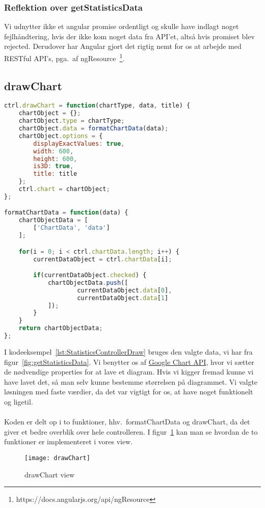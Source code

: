 \subsubsection{Reflektion over getStatisticsData}
Vi udnytter ikke et angular promise ordentligt og skulle have indlagt noget fejlhåndtering, hvis der ikke kom noget data fra API'et,
altså hvis promiset blev rejected.
Derudover har Angular gjort det rigtig nemt for os at arbejde med RESTful API's, pga.\ af ngResource~\footnote{https://docs.angularjs.org/api/ngResource}.
\subsection{drawChart}
\begin{lstlisting}[caption={drawChart}, language={JavaScript}, label={lst:StatisticsControllerDraw}]
ctrl.drawChart = function(chartType, data, title) {
    chartObject = {};
    chartObject.type = chartType;
    chartObject.data = formatChartData(data);
    chartObject.options = {
        displayExactValues: true,
        width: 600,
        height: 600,
        is3D: true,
        title: title
    };
    ctrl.chart = chartObject;
};

formatChartData = function(data) {
    chartObjectData = [
        ['ChartData', 'data']
    ];

    for(i = 0; i < ctrl.chartData.length; i++) {
        currentDataObject = ctrl.chartData[i];

        if(currentDataObject.checked) {
            chartObjectData.push([
                    currentDataObject.data[0],
                    currentDataObject.data[1]
            ]);
        }
    }
    return chartObjectData;
};
\end{lstlisting}
I kodeeksempel~\ref{lst:StatisticsControllerDraw} bruges den valgte data, vi har fra figur~\ref{fig:getStatisticsData}.
Vi benytter os af \hyperlink{GoogleChartAPI}{Google Chart API}, hvor vi sætter de nødvendige properties for at lave et diagram.
Hvis vi kigger fremad kunne vi have lavet det, så man selv kunne bestemme størrelsen på diagrammet. Vi valgte løsningen med faste værdier, da det var vigtigt for os, at have noget funktionelt
og ligetil.
\\\\
Koden er delt op i to funktioner, hhv.\ formatChartData og drawChart, da det giver et bedre overblik over hele controlleren.
I figur~\ref{fig:drawChart} kan man se hvordan de to funktioner er implementeret i vores view.
\begin{figure}[H]
\centering
\texttt{[image: drawChart]}
\caption{drawChart view}
\label{fig:drawChart}
\end{figure}
